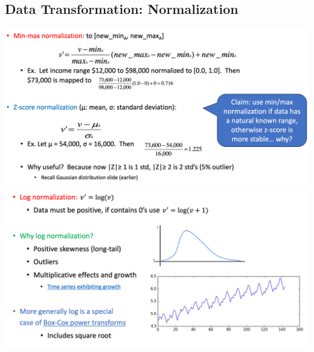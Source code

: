 \documentclass[11pt]{article}
\theoremstyle{definition}
\begin{document}
\subsection{Data Transformation: Normalization}
\includegraphics[width=\textwidth]{18.png}
\includegraphics[width=\textwidth]{19.png}
\end{document}
